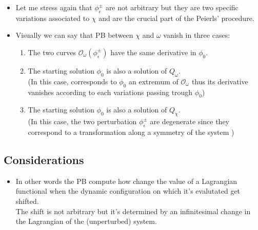 \documentclass[a4paper,11pt]{scrartcl}
\begin{document}
\begin{itemize}
        \item Let me stress again that $ \phi_\epsilon^\pm$ are not arbitrary but they are two specific variations associated to $\chi$ and are the crucial part of the Peierls' procedure.
        \item Visually we can say that PB between $\chi$ and $\omega$ vanish in three cases:
        \begin{enumerate}
            \item The two curves $\mathcal{O}_\omega ( \phi_\epsilon^\pm)$ have the same derivative in $\phi_0$.
            \item The starting solution $\phi_0$ is also a solution of $Q_\omega$.\\
                (In this case, corresponds to $\phi_0$  an extremum of $\mathcal{O}_\omega$ thus its derivative vanishes according to each variations passing trough $\phi_0$)
            \item The starting solution $\phi_0$ is also a solution of $Q_\chi$.\\
                (In this case, the two perturbation $\phi_\epsilon^\pm$ are degenerate since they correspond to a transformation along a symmetry of the system )
        \end{enumerate}

    \end{itemize}
    \subsection{Considerations}
    \begin{itemize}
    \item In other words the PB compute how change the value of a Lagrangian functional when the dynamic configuration on which it's evalutated get shifted.\\
    The shift is  not arbitrary but it's determined by an infinitesimal change in the Lagrangian of the (unperturbed) system.
    \end{itemize}
    \newpage
\end{document}
